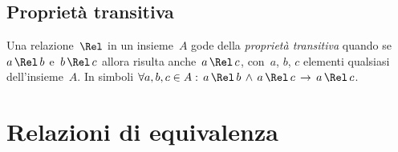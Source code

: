 \subsection{Proprietà transitiva}
%
%
%
% 
% 

\begin{definizione}
Una relazione~$\Rel$ in un insieme~$A$ gode della \emph{proprietà transitiva} quando se~$a \,\Rel\, b$ e~$b \,\Rel\, c$
allora risulta anche~$a \,\Rel\, c$, con~$a$, $b$, $c$ elementi qualsiasi dell'insieme~$A$.
In simboli $\forall a, b, c \in A:\, a\, \Rel\, b\, \wedge\, a\,\Rel\,c\,\rightarrow\,a\,\Rel\,c$.
\end{definizione}

\ovalbox{\risolvii \ref{ese:\thechapter.22}, \ref{ese:\thechapter.23}, \ref{ese:\thechapter.24}, \ref{ese:\thechapter.25}}
\pagebreak
\section{Relazioni di equivalenza}

